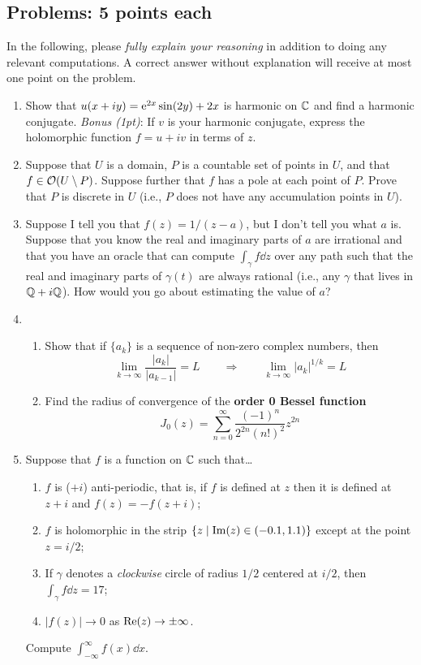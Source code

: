 \documentclass[../notes.tex]{subfiles}
\begin{document}
\subsection*{Problems: 5 points each}
In the following, please \emph{fully explain your reasoning} in addition to doing any relevant computations. A correct answer without explanation will receive at most one point on the problem.
\begin{enumerate}[label={\textbf{\arabic*.}}]
    \item Show that $u(x+iy)=\e[2x]\sin(2y)+2x$ is harmonic on $\C$ and find a harmonic conjugate. \emph{Bonus (1pt)}: If $v$ is your harmonic conjugate, express the holomorphic function $f=u+iv$ in terms of $z$.
    \item Suppose that $U$ is a domain, $P$ is a countable set of points in $U$, and that $f\in\mO(U\setminus P)$. Suppose further that $f$ has a pole at each point of $P$. Prove that $P$ is discrete in $U$ (i.e., $P$ does not have any accumulation points in $U$).
    \item Suppose I tell you that $f(z)=1/(z-a)$, but I don't tell you what $a$ is. Suppose that you know the real and imaginary parts of $a$ are irrational and that you have an oracle that can compute $\int_\gamma f\dd{z}$ over any path such that the real and imaginary parts of $\gamma(t)$ are always rational (i.e., any $\gamma$ that lives in $\Q+i\Q$). How would you go about estimating the value of $a$?
    \item 
    \begin{enumerate}
        \item Show that if $\{a_k\}$ is a sequence of non-zero complex numbers, then
        \begin{equation*}
            \lim_{k\to\infty}\frac{|a_k|}{|a_{k-1}|} = L
            \qquad\Longrightarrow\qquad
            \lim_{k\to\infty}|a_k|^{1/k} = L
        \end{equation*}
        \item Find the radius of convergence of the \textbf{order 0 Bessel function}
        \begin{equation*}
            J_0(z) = \sum_{n=0}^\infty\frac{(-1)^n}{2^{2n}(n!)^2}z^{2n}
        \end{equation*}
    \end{enumerate}
    \item Suppose that $f$ is a function on $\C$ such that\dots
    \begin{enumerate}
        \item $f$ is ($+i$) anti-periodic, that is, if $f$ is defined at $z$ then it is defined at $z+i$ and $f(z)=-f(z+i)$;
        \item $f$ is holomorphic in the strip $\{z\mid\im(z)\in(-0.1,1.1)\}$ except at the point $z=i/2$;
        \item If $\gamma$ denotes a \emph{clockwise} circle of radius $1/2$ centered at $i/2$, then $\int_\gamma f\dd{z}=17$;
        \item $|f(z)|\to 0$ as $\re(z)\to\pm\infty$.
    \end{enumerate}
    Compute $\int_{-\infty}^\infty f(x)\dd{x}$.
\end{enumerate}
\end{document}
